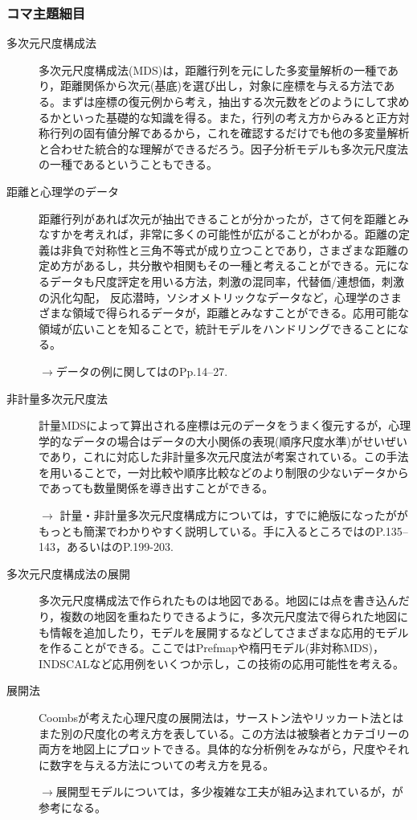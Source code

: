 \subsubsection{コマ主題細目}
\begin{description}
	\item[多次元尺度構成法] 多次元尺度構成法(MDS)は，距離行列を元にした多変量解析の一種であり，距離関係から次元(基底)を選び出し，対象に座標を与える方法である。まずは座標の復元例から考え，抽出する次元数をどのようにして求めるかといった基礎的な知識を得る。また，行列の考え方からみると正方対称行列の固有値分解であるから，これを確認するだけでも他の多変量解析と合わせた統合的な理解ができるだろう。因子分析モデルも多次元尺度法の一種であるということもできる。



	\item[距離と心理学のデータ] 距離行列があれば次元が抽出できることが分かったが，さて何を距離とみなすかを考えれば，非常に多くの可能性が広がることがわかる。距離の定義は非負で対称性と三角不等式が成り立つことであり，さまざまな距離の定め方があるし，共分散や相関もその一種と考えることができる。元になるデータも尺度評定を用いる方法，刺激の混同率，代替価/連想価，刺激の汎化勾配，    反応潜時，ソシオメトリックなデータなど，心理学のさまざまな領域で得られるデータが，距離とみなすことができる。応用可能な領域が広いことを知ることで，統計モデルをハンドリングできることになる。
	      \begin{flushright}
		      $\to$データの例に関しては\textcite{Takane198002}のPp.14--27.
	      \end{flushright}
	\item[非計量多次元尺度法] 計量MDSによって算出される座標は元のデータをうまく復元するが，心理学的なデータの場合はデータの大小関係の表現(順序尺度水準)がせいぜいであり，これに対応した非計量多次元尺度法が考案されている。この手法を用いることで，一対比較や順序比較などのより制限の少ないデータからであっても数量関係を導き出すことができる。
	      \begin{flushright}
		      $\to$ 計量・非計量多次元尺度構成方については，すでに絶版になったが\textcite{Okada19940115}がもっとも簡潔でわかりやすく説明している。手に入るところでは\textcite{Adachi200607}のP.135--143，あるいは\textcite{kosugi2019b}のP.199-203.
	      \end{flushright}
	\item[多次元尺度構成法の展開]多次元尺度構成法で作られたものは地図である。地図には点を書き込んだり，複数の地図を重ねたりできるように，多次元尺度法で得られた地図にも情報を追加したり，モデルを展開するなどしてさまざまな応用的モデルを作ることができる。ここではPrefmapや楕円モデル(非対称MDS)，INDSCALなど応用例をいくつか示し，この技術の応用可能性を考える。
	\item[展開法] Coombsが考えた心理尺度の展開法は，サーストン法やリッカート法とはまた別の尺度化の考え方を表している。この方法は被験者とカテゴリーの両方を地図上にプロットできる。具体的な分析例をみながら，尺度やそれに数字を与える方法についての考え方を見る。
	      \begin{flushright}
		      $\to$展開型モデルについては，多少複雑な工夫が組み込まれているが，\textcite{shimizu2018}が参考になる。
	      \end{flushright}


\end{description}
